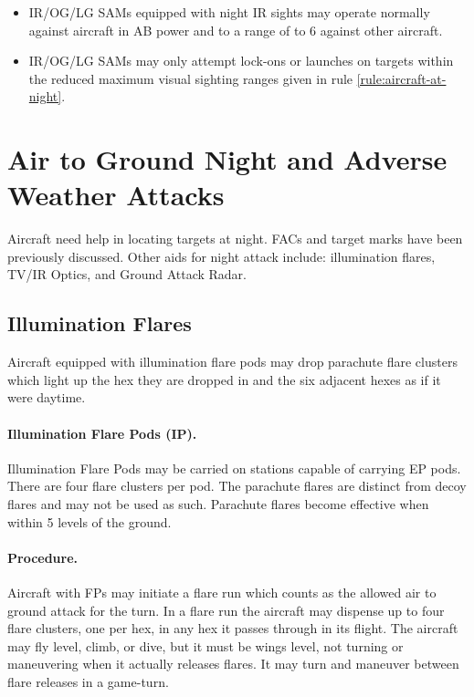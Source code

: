\begin{advancedrules}
{\begin{itemize}
    \item IR/OG/LG SAMs equipped with night IR sights may operate normally against aircraft in AB power and to a range of to 6 against other aircraft.

    \item IR/OG/LG SAMs may only attempt lock-ons or launches on targets within the reduced maximum visual sighting ranges given in rule \ref{rule:aircraft-at-night}. 

\end{itemize}

\section{Air to Ground Night and Adverse Weather Attacks}

Aircraft need help in locating targets at night. FACs and target marks have been previously discussed. Other aids for night attack include: illumination flares, TV/IR Optics, and Ground Attack Radar.
}

\subsection{Illumination Flares}

Aircraft equipped with illumination flare pods may drop parachute flare clusters which light up the hex they are dropped in and the six adjacent hexes as if it were daytime.

\paragraph{Illumination Flare Pods (IP).} Illumination Flare Pods may be carried on stations capable of carrying EP pods. There are four flare clusters per pod. The parachute flares are distinct from decoy flares and may not be used as such. Parachute flares become effective when within 5 levels of the ground.

\paragraph{Procedure.} Aircraft with FPs may initiate a flare run which counts as the allowed air to ground attack for the turn. In a flare run the aircraft may dispense up to four flare clusters, one per hex, in any hex it passes through in its flight. The aircraft may fly level, climb, or dive, but it must be wings level, not turning or maneuvering when it actually releases flares. It may turn and maneuver between flare releases in a game-turn.


\end{advancedrules}
